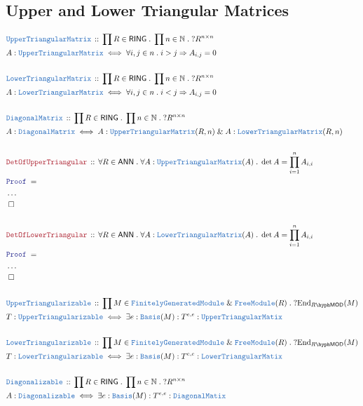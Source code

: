 \documentclass[12pt]{scrartcl}
\newcommand{\TYPE}[1]{\textcolor{NavyBlue}{\mathtt{#1}}}
\newcommand{\LOGIC}[1]{\textcolor{Blue}{\mathtt{#1}}}
\newcommand{\THM}[1]{\textcolor{Maroon}{\mathtt{#1}}}
\renewcommand{\.}{\; . \;}
\newcommand{\Theorem}[2]{& \THM{#1} \, :: \, #2 \\ & \Proof = \\ }
\newcommand{\DeclareType}[2]{& \TYPE{#1} \, :: \, #2 \\}
\newcommand{\DefineType}[3]{& #1 : \TYPE{#2} \iff #3 \\}
\newcommand{\Page}[1]{ \begin{align*} #1 \end{align*}   }
\newcommand{\NoProof}{ & \ldots \\ \EndProof}
\renewcommand{\And}{\; \& \;}
\newcommand{\Nat}{\mathbb{N} }
\newcommand{\End}{\mathrm{End}}
\newcommand{\QED}{\; \square}
\newcommand{\EndProof}{& \QED \\}
\newcommand{\Proof}{\LOGIC{Proof} \; }
\newcommand{\FGM}{\TYPE{FinitelyGeneratedModule}}
\newcommand{\FM}{\TYPE{FreeModule}}
\newcommand{\LMOD}[1]{#1\hyph\mathsf{MOD}}
\newcommand{\RING}{\mathsf{RING}}
\newcommand{\ANN}{\mathsf{ANN}}
\begin{document}
\subsection{Upper and Lower Triangular Matrices}
\Page{
	\DeclareType{UpperTriangularMatrix}{\prod R \in \RING \. \prod n \in \Nat \. ?R^{n \times n}}
	\DefineType{A}{UpperTriangularMatrix}{ \forall i,j \in n \. i > j \Rightarrow A_{i,j} = 0}
	\\
	\DeclareType{LowerTriangularMatrix}{\prod R \in \RING \. \prod n \in \Nat \. ?R^{n \times n}}
	\DefineType{A}{LowerTriangularMatrix}{ \forall i,j \in n \. i < j \Rightarrow A_{i,j} = 0}
	\\
	\DeclareType{DiagonalMatrix}{\prod R \in \RING \. \prod n \in \Nat \. ?R^{n \times n}}
	\DefineType{A}{DiagonalMatrix}{ A : \TYPE{UpperTriangularMatrix}(R,n) \And A : \TYPE{LowerTriangularMatrix}(R,n)}
	\\
	\Theorem{DetOfUpperTriangular}{\forall R \in \ANN \. \forall A : \TYPE{UpperTriangularMatrix}(A) \. \det A = \prod^n_{i=1} A_{i,i}}
	\NoProof
	\\
	\Theorem{DetOfLowerTriangular}{\forall R \in \ANN \. \forall A : \TYPE{LowerTriangularMatrix}(A) \. \det A = \prod^n_{i=1} A_{i,i}}
	\NoProof
	\\
	\DeclareType{UpperTriangularizable}{\prod M \in \FGM \And \FM(R) \. ?\End_{\LMOD{R}}(M)}
	\DefineType{T}{UpperTriangularizable}{ \exists e : \TYPE{Basis}(M) : T^{e,e} : \TYPE{UpperTriangularMatix}}
	\\
	\DeclareType{LowerTriangularizable}{\prod M \in \FGM \And \FM(R) \. ?\End_{\LMOD{R}}(M)}
	\DefineType{T}{LowerTriangularizable}{ \exists e : \TYPE{Basis}(M) : T^{e,e} : \TYPE{LowerTriangularMatix}}
	\\
	\DeclareType{Diagonalizable}{\prod R \in \RING \. \prod n \in \Nat \. ?R^{n \times n}}
	\DefineType{A}{Diagonalizable}{\exists e : \TYPE{Basis}(M) : T^{e,e} : \TYPE{DiagonalMatix} }
}
\newpage
\end{document}
